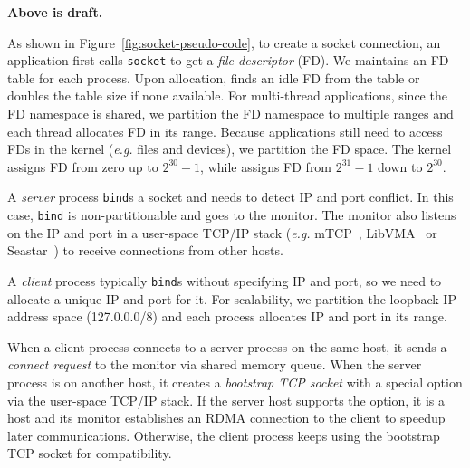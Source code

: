 \textbf{Above is draft.}

As shown in Figure~\ref{fig:socket-pseudo-code}, to create a socket connection, an application first calls \texttt{socket} to get a \textit{file descriptor} (FD). 
We maintains an FD table for each process. Upon allocation, \libipc{} finds an idle FD from the table or doubles the table size if none available. 
For multi-thread applications, since the FD namespace is shared, we partition the FD namespace to multiple ranges and each thread allocates FD in its range.
Because applications still need to access FDs in the kernel (\textit{e.g.} files and devices), we partition the FD space. The kernel assigns FD from zero up to $2^{30}-1$, while \libipc assigns FD from $2^{31}-1$ down to $2^{30}$.

A \emph{server} process \texttt{bind}s a socket and needs to detect IP and port conflict. In this case, \texttt{bind} is non-partitionable and goes to the monitor. The monitor also listens on the IP and port in a user-space TCP/IP stack (\textit{e.g.} mTCP~\cite{jeong2014mtcp}, LibVMA~\cite{libvma} or Seastar~\cite{seastar}) to receive connections from other hosts.

A \emph{client} process typically \texttt{bind}s without specifying IP and port, so we need to allocate a unique IP and port for it. For scalability, we partition the loopback IP address space (127.0.0.0/8) and each process allocates IP and port in its range.

When a client process connects to a server process on the same host, it sends a \textit{connect request} to the monitor via shared memory queue. When the server process is on another host, it creates a \textit{bootstrap TCP socket} with a special option via the user-space TCP/IP stack. If the server host supports the option, it is a \sys host and its monitor establishes an RDMA connection to the client to speedup later communications. Otherwise, the client process keeps using the bootstrap TCP socket for compatibility.

